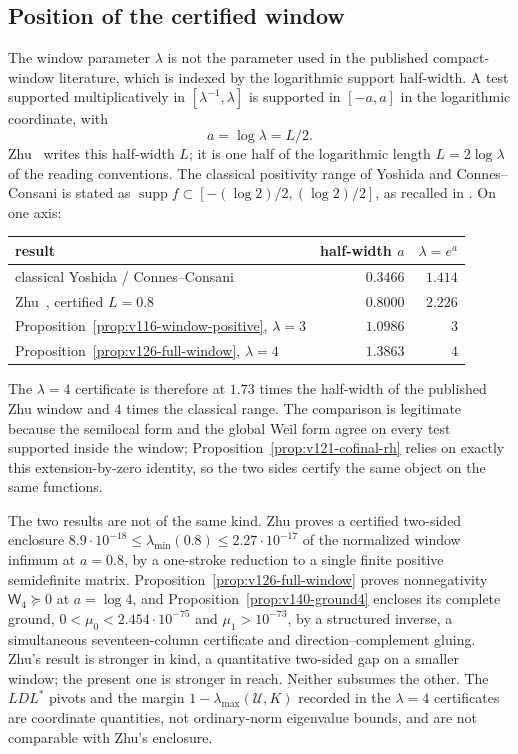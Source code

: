 \subsection*{Position of the certified window}
\label{sec:v141-window-position}
The window parameter $\lambda$ is not the parameter used in the
published compact-window literature, which is indexed by the
logarithmic support half-width. A test supported multiplicatively in
$[\lambda^{-1},\lambda]$ is supported in $[-a,a]$ in the logarithmic
coordinate, with
\[
 a=\log\lambda=L/2 .
\]
Zhu~\cite{Zhu2026} writes this half-width $L$; it is one half of the
logarithmic length $L=2\log\lambda$ of the reading conventions. The
classical positivity range of Yoshida and Connes--Consani is stated
as $\operatorname{supp}f\subset[-(\log2)/2,(\log2)/2]$, as recalled in
\cite{Zhu2026}. On one axis:
\begin{center}
\begin{tabular}{lrr}
\toprule
result & half-width $a$ & $\lambda=e^{a}$\\
\midrule
classical Yoshida / Connes--Consani & $0.3466$ & $1.414$\\
Zhu~\cite{Zhu2026}, certified $L=0.8$ & $0.8000$ & $2.226$\\
Proposition~\ref{prop:v116-window-positive}, $\lambda=3$ & $1.0986$ & $3$\\
Proposition~\ref{prop:v126-full-window}, $\lambda=4$ & $1.3863$ & $4$\\
\bottomrule
\end{tabular}
\end{center}
The $\lambda=4$ certificate is therefore at $1.73$ times the
half-width of the published Zhu window and $4$ times the classical
range. The comparison is legitimate because the semilocal form and the
global Weil form agree on every test supported inside the window;
Proposition~\ref{prop:v121-cofinal-rh} relies on exactly this
extension-by-zero identity, so the two sides certify the same object
on the same functions.

The two results are not of the same kind. Zhu proves a certified
two-sided enclosure
$8.9\cdot10^{-18}\le\lambda_{\min}(0.8)\le2.27\cdot10^{-17}$ of the
normalized window infimum at $a=0.8$, by a one-stroke reduction to a
single finite positive semidefinite matrix.
Proposition~\ref{prop:v126-full-window} proves nonnegativity
$\mathsf W_4\succeq0$ at $a=\log4$, and
Proposition~\ref{prop:v140-ground4} encloses its complete ground,
$0<\mu_0<2.454\cdot10^{-75}$ and $\mu_1>10^{-73}$, by a structured
inverse, a simultaneous seventeen-column certificate and
direction--complement gluing. Zhu's result is stronger in kind, a
quantitative two-sided gap on a smaller window; the present one is
stronger in reach. Neither subsumes the other. The $LDL^*$ pivots and
the margin $1-\lambda_{\max}(\mathcal U,K)$ recorded in the
$\lambda=4$ certificates are coordinate quantities, not ordinary-norm
eigenvalue bounds, and are not comparable with Zhu's enclosure.

